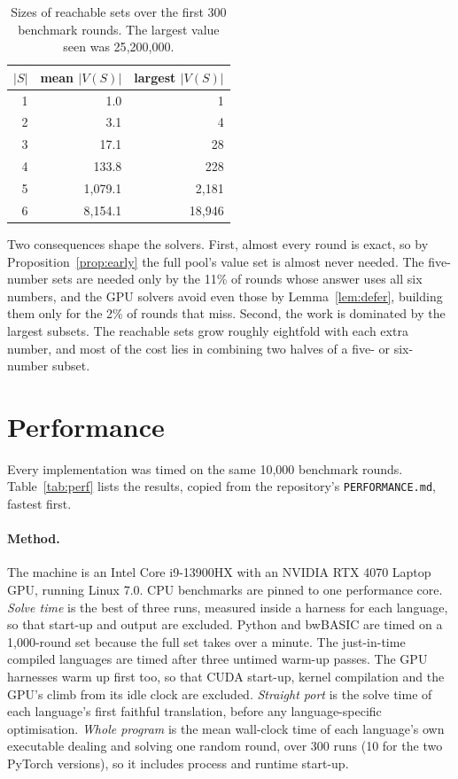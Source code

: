 \documentclass[11pt,a4paper]{article}
\theoremstyle{definition}
\theoremstyle{remark}
\begin{document}
\begin{table}[ht]
\centering
\begin{tabular}{rrr}
\toprule
$|S|$ & mean $|V(S)|$ & largest $|V(S)|$ \\ \midrule
1 & 1.0 & 1 \\
2 & 3.1 & 4 \\
3 & 17.1 & 28 \\
4 & 133.8 & 228 \\
5 & 1{,}079.1 & 2{,}181 \\
6 & 8{,}154.1 & 18{,}946 \\ \bottomrule
\end{tabular}
\caption{Sizes of reachable sets over the first 300 benchmark rounds. The largest value seen was 25{,}200{,}000.}\label{tab:sets}
\end{table}

Two consequences shape the solvers. First, almost every round is exact, so by
Proposition~\ref{prop:early} the full pool's value set is almost never needed. The five-number sets are needed only by the 11\% of
rounds whose answer uses all six numbers, and the GPU solvers avoid even those by Lemma~\ref{lem:defer},
building them only for the 2\% of rounds that miss. Second, the work is dominated by the largest subsets. The reachable sets
grow roughly eightfold with each extra number, and most of the cost lies in combining two halves of a
five- or six-number subset.

\section{Performance}\label{sec:performance}

Every implementation was timed on the same 10{,}000 benchmark rounds. Table~\ref{tab:perf} lists the
results, copied from the repository's \texttt{PERFORMANCE.md}, fastest first.

\paragraph{Method.}
The machine is an Intel Core i9-13900HX with an NVIDIA RTX 4070 Laptop GPU, running Linux 7.0. CPU
benchmarks are pinned to one performance core. \emph{Solve time} is the best of three runs, measured
inside a harness for each language, so that start-up and output are excluded. Python and bwBASIC are timed on a
1{,}000-round set because the full set takes over a minute. The just-in-time compiled languages are timed after three
untimed warm-up passes. The GPU harnesses warm up first too, so that CUDA start-up, kernel compilation and
the GPU's climb from its idle clock are excluded. \emph{Straight port} is the solve time of each language's
first faithful translation, before any language-specific optimisation. \emph{Whole program} is the mean
wall-clock time of each language's own executable dealing and solving one random round, over 300 runs (10
for the two PyTorch versions), so it includes process and runtime start-up.
\end{document}
